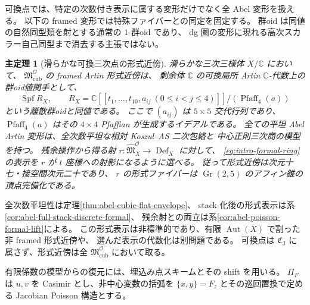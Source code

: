 \documentclass[11pt,a4paper]{ltjsarticle}
\numberwithin{equation}{section}
\newtheorem{maintheorem}{主定理}
\newcommand{\C}{\mathbb C}
\newcommand{\Aut}{\operatorname{Aut}}
\begin{document}
可換点では、特定の次数付き表示に属する変形だけでなく全 Abel 変形を扱える。
以下の framed 変形では特殊ファイバーとの同定を固定する。
群oid は同値の自然同型類を射とする通常の $1$-群oid であり、
dg 圏の変形に現れる高次スカラー自己同型まで消去する主張ではない。

\begin{maintheorem}[滑らかな可換三次点の形式近傍]\label{thm:intro-formal}
滑らかな三次三様体 $X/\C$ において、
$\mathfrak M^{\mathcal O}_{\mathrm{cub}}$ の framed Artin 形式近傍は、
剰余体 $\C$ の可換局所 Artin $\C$-代数上の群oid値関手として、
\begin{equation}\label{eq:intro-formal-ring}
 \operatorname{Spf} R_X,\qquad
 R_X=\C[[t_1,\ldots,t_{10},a_{ij}\ (0\le i<j\le4)]]
           /(\operatorname{Pfaff}_4(a))
\end{equation}
という離散群oidと同値である。
ここで $(a_{ij})$ は $5\times5$ 交代行列であり、
$\operatorname{Pfaff}_4(a)$ はその $4\times4$ Pfaffian が生成するイデアルである。
全ての平坦 Abel Artin 変形は、全次数平坦な相対 Koszul--AS 二次包絡と
中心正則三次商の模型を持つ。
残余操作から得る射 $r:\widehat{\mathfrak M}^{\mathcal O}_{X}\to\operatorname{Def}_X$ に対して、
\eqref{eq:intro-formal-ring}の表示を $r$ が $t$ 座標への射影になるように選べる。
従って形式近傍は次元十七・接空間次元二十であり、
$r$ の形式ファイバーは $\operatorname{Gr}(2,5)$ のアフィン錐の頂点完備化である。
\end{maintheorem}

全次数平坦性は定理\ref{thm:abel-cubic-flat-envelope}、
stack 化後の形式表示は系\ref{cor:abel-full-stack-discrete-formal}、
残余射との両立は系\ref{cor:abel-poisson-formal-lift}による。
この形式表示は非標準的であり、有限 $\Aut(X)$ で割った非 framed 形式近傍や、
選んだ表示の代数化は別問題である。
可換点は $\mathfrak C_{\mathrm J}$ に属さず、形式近傍は全
$\mathfrak M^{\mathcal O}_{\mathrm{cub}}$ において取る。

有限係数の模型からの復元には、埋込み点スキームとその shift を用いる。
$\Pi_F$ は $u,v$ を Casimir とし、非中心変数の括弧を
$\{x,y\}=F_z$ とその巡回置換で定める Jacobian Poisson 構造とする。
\end{document}
